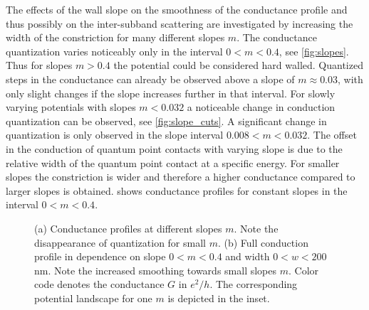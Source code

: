 The effects of the wall slope on the smoothness of the conductance profile and thus possibly on the inter-subband scattering are investigated by increasing the width of the constriction for many different slopes $m$. The conductance quantization varies noticeably only in the interval $0 < m < 0.4$, see \cref{fig:slopes}. Thus for slopes $m > 0.4$ the potential could be considered hard walled.  Quantized steps in the conductance can already be observed above a slope of $m \approx 0.03$, with only slight changes if the slope increases further in that interval. For slowly varying potentials with slopes $m<0.032$ a noticeable change in conduction quantization can be observed, see \cref{fig:slope_cuts}. A significant change in quantization is only observed in the slope interval $0.008 < m < 0.032$. The offset in the conduction of quantum point contacts with varying slope is due to the relative width of the quantum point contact at a specific energy. For smaller slopes the constriction is wider and therefore a higher conductance compared to larger slopes is obtained.  shows conductance profiles for constant slopes in the interval $0 < m < 0.4$.\par
\begin{figure}[h] 
  \caption{(a) Conductance profiles at different slopes $m$. Note the disappearance of quantization for small $m$. (b) Full conduction profile in dependence on slope $0 < m < 0.4$ and width $0 < w < 200$ nm. Note the increased smoothing towards small slopes $m$. Color code denotes the conductance $G$ in $e^2/h$. The corresponding potential landscape for one $m$ is depicted in the inset.}\label{fig:conductances}
\end{figure}
